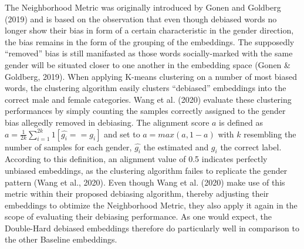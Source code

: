 \documentclass[
  english,
  man,floatsintext]{apa6}
\begin{document}
The Neighborhood Metric was originally introduced by Gonen and Goldberg (2019) and is based on the observation that even though debiased words no longer show their bias in form of a certain characteristic in the gender direction, the bias remains in the form of the grouping of the embeddings. The supposedly ``removed'' bias is still manifasted as those words socially-marked with the same gender will be situated closer to one another in the embedding space (Gonen \& Goldberg, 2019).
When applying K-means clustering on a number of most biased words, the clustering algorithm easily clusters ``debiased'' embeddings into the correct male and female categories.
Wang et al. (2020) evaluate these clustering performances by simply counting the samples correctly assigned to the gender bias allegedly removed in debiasing. The alignment score \(a\) is defined as \(a = \frac{1}{2k}\sum_{i=1}^{2k}1[\hat{g_{i}}== g_{i}]\) and set to \(a = max(a, 1-a)\) with \(k\) resembling the number of samples for each gender, \(\hat{g_{i}}\) the estimated and \(g_{i}\) the correct label. According to this definition, an alignment value of 0.5 indicates perfectly unbiased embeddings, as the clustering algorithm failes to replicate the gender pattern (Wang et al., 2020).
Even though Wang et al. (2020) make use of this metric within their proposed debiasing algorithm, thereby adjusting their embeddings to obtimize the Neighborhood Metric, they also apply it again in the scope of evaluating their debiasing performance. As one would expect, the Double-Hard debiased embeddings therefore do particularly well in comparison to the other Baseline embeddings.
\end{document}
